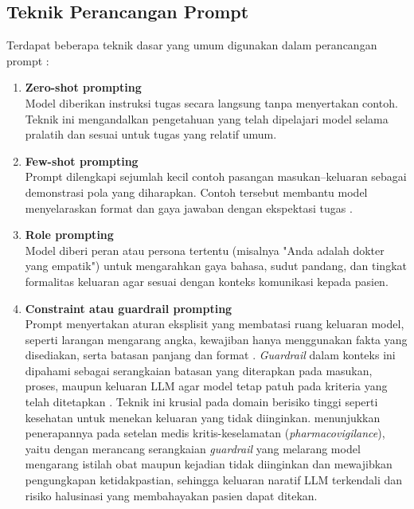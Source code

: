 \subsection{Teknik Perancangan Prompt}
Terdapat beberapa teknik dasar yang umum digunakan dalam perancangan prompt \autocite{Naveed2023Comprehensive}:
\begin{enumerate}
    \item \textbf{Zero-shot prompting}\\
    Model diberikan instruksi tugas secara langsung tanpa menyertakan contoh. Teknik ini mengandalkan pengetahuan yang telah dipelajari model selama pralatih dan sesuai untuk tugas yang relatif umum.

    \item \textbf{Few-shot prompting}\\
    Prompt dilengkapi sejumlah kecil contoh pasangan masukan--keluaran sebagai demonstrasi pola yang diharapkan. Contoh tersebut membantu model menyelaraskan format dan gaya jawaban dengan ekspektasi tugas \autocite{Brown2020Language}.

    \item \textbf{Role prompting}\\
    Model diberi peran atau persona tertentu (misalnya "Anda adalah dokter yang empatik") untuk mengarahkan gaya bahasa, sudut pandang, dan tingkat formalitas keluaran agar sesuai dengan konteks komunikasi kepada pasien.

    \item \textbf{Constraint atau guardrail prompting}\\
    Prompt menyertakan aturan eksplisit yang membatasi ruang keluaran model, seperti larangan mengarang angka, kewajiban hanya menggunakan fakta yang disediakan, serta batasan panjang dan format \autocite{Hakim2025Guardrails}. \emph{Guardrail} dalam konteks ini dipahami sebagai serangkaian batasan yang diterapkan pada masukan, proses, maupun keluaran LLM agar model tetap patuh pada kriteria yang telah ditetapkan \autocite{Hakim2025Guardrails}. Teknik ini krusial pada domain berisiko tinggi seperti kesehatan untuk menekan keluaran yang tidak diinginkan. \textcite{Hakim2025Guardrails} menunjukkan penerapannya pada setelan medis kritis-keselamatan (\emph{pharmacovigilance}), yaitu dengan merancang serangkaian \emph{guardrail} yang melarang model mengarang istilah obat maupun kejadian tidak diinginkan dan mewajibkan pengungkapan ketidakpastian, sehingga keluaran naratif LLM terkendali dan risiko halusinasi yang membahayakan pasien dapat ditekan.
\end{enumerate}

